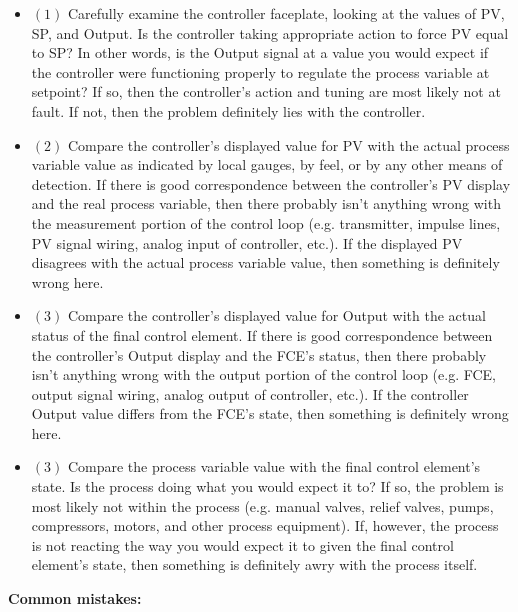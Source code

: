 \documentclass[12pt,a4paper]{article}
\begin{document}
\begin{itemize}
\item{$(1)$}  Carefully examine the controller faceplate, looking at the values of PV, SP, and Output.  Is the controller taking appropriate action to force PV equal to SP?  In other words, is the Output signal at a value you would expect if the controller were functioning properly to regulate the process variable at setpoint?  If so, then the controller's action and tuning are most likely not at fault.  If not, then the problem definitely lies with the controller.
\item{$(2)$}  Compare the controller's displayed value for PV with the actual process variable value as indicated by local gauges, by feel, or by any other means of detection.  If there is good correspondence between the controller's PV display and the real process variable, then there probably isn't anything wrong with the measurement portion of the control loop (e.g. transmitter, impulse lines, PV signal wiring, analog input of controller, etc.).  If the displayed PV disagrees with the actual process variable value, then something is definitely wrong here.
\item{$(3)$}  Compare the controller's displayed value for Output with the actual status of the final control element.  If there is good correspondence between the controller's Output display and the FCE's status, then there probably isn't anything wrong with the output portion of the control loop (e.g. FCE, output signal wiring, analog output of controller, etc.).  If the controller Output value differs from the FCE's state, then something is definitely wrong here.
\item{$(3)$}  Compare the process variable value with the final control element's state.  Is the process doing what you would expect it to?  If so, the problem is most likely not within the process (e.g. manual valves, relief valves, pumps, compressors, motors, and other process equipment).  If, however, the process is not reacting the way you would expect it to given the final control element's state, then something is definitely awry with the process itself.
\end{itemize}





\vskip 10pt

\filbreak

{\bf Common mistakes:}
\end{document}
